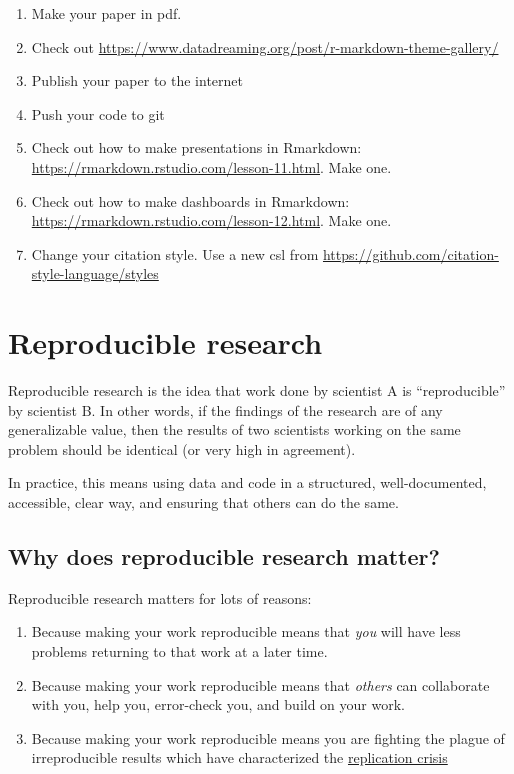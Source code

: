 \documentclass[
]{book}
\providecommand{\tightlist}{%
  \setlength{\itemsep}{0pt}\setlength{\parskip}{0pt}}
\begin{document}
\begin{enumerate}
\item
  Make your paper in pdf.
\item
  Check out \url{https://www.datadreaming.org/post/r-markdown-theme-gallery/}
\item
  Publish your paper to the internet
\item
  Push your code to git
\item
  Check out how to make presentations in Rmarkdown: \url{https://rmarkdown.rstudio.com/lesson-11.html}. Make one.
\item
  Check out how to make dashboards in Rmarkdown: \url{https://rmarkdown.rstudio.com/lesson-12.html}. Make one.
\item
  Change your citation style. Use a new csl from \url{https://github.com/citation-style-language/styles}
\end{enumerate}

\hypertarget{rr}{%
\chapter{Reproducible research}\label{rr}}

Reproducible research is the idea that work done by scientist A is ``reproducible'' by scientist B. In other words, if the findings of the research are of any generalizable value, then the results of two scientists working on the same problem should be identical (or very high in agreement).

In practice, this means using data and code in a structured, well-documented, accessible, clear way, and ensuring that others can do the same.

\hypertarget{why-does-reproducible-research-matter}{%
\section*{Why does reproducible research matter?}\label{why-does-reproducible-research-matter}}

Reproducible research matters for lots of reasons:

\begin{enumerate}
\def\labelenumi{\arabic{enumi}.}
\tightlist
\item
  Because making your work reproducible means that \emph{you} will have less problems returning to that work at a later time.\\
\item
  Because making your work reproducible means that \emph{others} can collaborate with you, help you, error-check you, and build on your work.\\
\item
  Because making your work reproducible means you are fighting the plague of irreproducible results which have characterized the \href{https://en.wikipedia.org/wiki/Replication_crisis}{replication crisis}
\end{enumerate}
\end{document}
